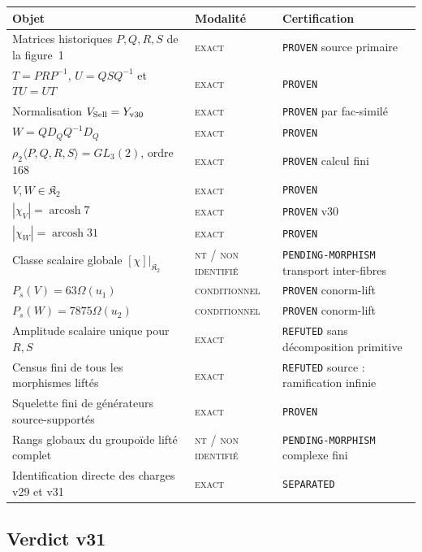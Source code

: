 \documentclass[11pt,a4paper]{article}
\newcommand{\statusExact}{\textsc{exact}}
\newcommand{\statusCond}{\textsc{conditionnel}}
\newcommand{\statusNT}{\textsc{nt / non identifié}}
\newcommand{\certProven}{\texttt{PROVEN}}
\newcommand{\certRefuted}{\texttt{REFUTED}}
\newcommand{\certSeparated}{\texttt{SEPARATED}}
\newcommand{\certPending}{\texttt{PENDING-MORPHISM}}
\begin{document}
\begin{longtable}{p{}p{}p{}}
\toprule
Objet & Modalité & Certification\\
\midrule
\endhead
Matrices historiques $P,Q,R,S$ de la figure~1 & \statusExact & \certProven{} source primaire\\
$T=PRP^{-1}$, $U=QSQ^{-1}$ et $TU=UT$ & \statusExact & \certProven\\
Normalisation $V_{\rm Sell}=Y_{\rm v30}$ & \statusExact & \certProven{} par fac-similé\\
$W=QD_QQ^{-1}D_Q$ & \statusExact & \certProven\\
$\rho_2\langle P,Q,R,S\rangle=GL_3(2)$, ordre $168$ & \statusExact & \certProven{} calcul fini\\
$V,W\in\mathfrak K_2$ & \statusExact & \certProven\\
$|\chi_V|=\operatorname{arcosh}7$ & \statusExact & \certProven{} v30\\
$|\chi_W|=\operatorname{arcosh}31$ & \statusExact & \certProven\\
Classe scalaire globale $[\chi]|_{\mathfrak K_2}$ & \statusNT & \certPending{} transport inter-fibres\\
$P_s(V)=63\Omega(u_1)$ & \statusCond & \certProven{} conorm-lift\\
$P_s(W)=7875\Omega(u_2)$ & \statusCond & \certProven{} conorm-lift\\
Amplitude scalaire unique pour $R,S$ & \statusExact & \certRefuted{} sans décomposition primitive\\
Census fini de tous les morphismes liftés & \statusExact & \certRefuted{} source : ramification infinie\\
Squelette fini de générateurs source-supportés & \statusExact & \certProven\\
Rangs globaux du groupoïde lifté complet & \statusNT & \certPending{} complexe fini\\
Identification directe des charges v29 et v31 & \statusExact & \certSeparated\\
\bottomrule
\end{longtable}

\subsection{Verdict v31}
\end{document}
